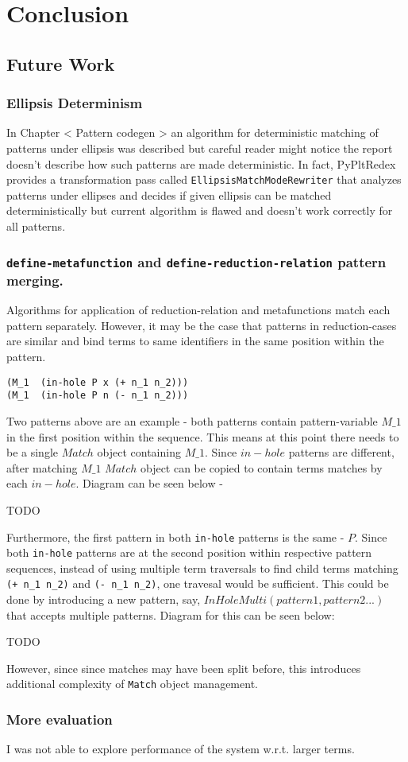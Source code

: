 \chapter{Conclusion} 

\section{Future Work}
\subsection{Ellipsis Determinism}
In Chapter < Pattern codegen > an algorithm for deterministic matching of patterns under ellipsis was described but careful reader might notice the report doesn't describe how such patterns are made deterministic. In fact, PyPltRedex provides a transformation pass called \texttt{EllipsisMatchModeRewriter} that analyzes patterns under ellipses and decides if given ellipsis can be matched deterministically but current algorithm is flawed and doesn't work correctly for all patterns. 


\subsection{\texttt{define-metafunction} and \texttt{define-reduction-relation} pattern merging.}

Algorithms for application of reduction-relation and metafunctions match each pattern separately. However, it may be the case that patterns in reduction-cases are similar and bind terms to same identifiers in the same position within the pattern.

\begin{lstlisting}
(M_1  (in-hole P x (+ n_1 n_2)))
(M_1  (in-hole P n (- n_1 n_2)))
\end{lstlisting}

Two patterns above are an example - both patterns contain pattern-variable $M\_1$ in the first position within the sequence. This means at this point there needs to be a single $Match$ object containing $M\_1$. Since $in-hole$ patterns are different, after matching $M\_1$ $Match$ object can be copied to contain terms matches by each $in-hole$. Diagram can be seen below - 

TODO


Furthermore, the first pattern in both \texttt{in-hole} patterns is the same - $P$. Since both \texttt{in-hole} patterns are at the second position within respective pattern sequences, instead of using multiple term traversals to find child terms matching \texttt{(+ n\_1 n\_2)} and \texttt{(- n\_1 n\_2)}, one travesal would be sufficient. This could be done by introducing a new pattern, say, $InHoleMulti(pattern1, pattern2 ...)$ that accepts multiple patterns. Diagram for this can be seen below:

TODO


However, since since matches may have been split before, this introduces additional complexity of \texttt{Match} object management.

\subsection{More evaluation}

I was not able to explore performance of the system w.r.t. larger terms.
